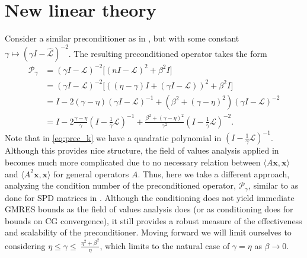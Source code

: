 \documentclass[a4paper,10pt]{article}
\begin{document}
\allowdisplaybreaks



\section{New linear theory}

Consider a similar preconditioner as in
, but with some constant $\gamma \mapsto
(\gamma I - \widehat{\mathcal{L}})^{-2}$. The resulting preconditioned
operator takes the form
%
\begin{align}\nonumber
\mathcal{P}_\gamma & =
(\gamma I - \mathcal{L})^{-2}\Big[(nI - \mathcal{L})^2 + \beta^2 I\Big] \\ \nonumber
& = (\gamma I - \mathcal{L})^{-2}\Big[((\eta-\gamma)I + (\gamma I - \mathcal{L}))^2 + \beta^2 I\Big] \\
& = I - 2(\gamma-\eta)(\gamma I - \mathcal{L})^{-1} + (\beta^2 + (\gamma-\eta)^2)(\gamma I -
	\mathcal{L})^{-2} \nonumber\\
& = I - 2\frac{\gamma-\eta}{\gamma}\left(I - \tfrac{1}{\gamma}\mathcal{L}\right)^{-1} +
	\frac{\beta^2 + (\gamma-\eta)^2}{\gamma^2}
	\left(I - \tfrac{1}{\gamma}\mathcal{L}\right)^{-2}.\label{eq:prec_k}
\end{align}
%
Note that in \eqref{eq:prec_k} we have a quadratic polynomial in
$(I - \tfrac{1}{\gamma}\mathcal{L})^{-1}$. Although this provides
nice structure, the field of values analysis applied in 
becomes much more complicated due to no necessary relation between
$\langle A\mathbf{x},\mathbf{x}\rangle$ and
$\langle A^2\mathbf{x},\mathbf{x}\rangle$ for general operators $A$. Thus, here
we take a different approach, analyzing the condition number of the preconditioned
operator, $\mathcal{P}_\gamma$, similar to as done for SPD matrices in \cite{exh}.
Although the conditioning does not yield immediate GMRES bounds as the field of values
analysis does (or as conditioning does for bounds on CG convergence), it still
provides a robust measure of the effectiveness and scalability of the
preconditioner.
Moving forward we will limit ourselves to considering $\eta \leq \gamma \leq \
\tfrac{\eta^2+\beta^2}{\eta}$, which limits to the natural case of $\gamma = \eta$
as $\beta \to 0$.
\end{document}
